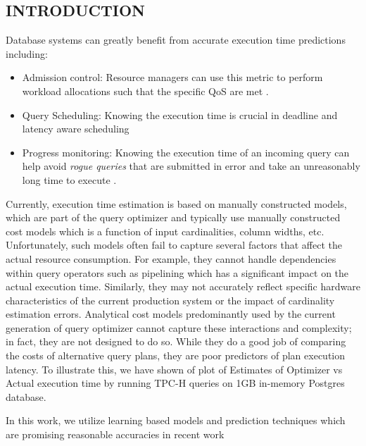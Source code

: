 \documentclass{article}
\begin{document}
	\begin{multicols}{2}
	\section{INTRODUCTION}
	Database systems can greatly benefit from accurate execution time predictions including: 
	\begin{itemize}
	\item Admission control: Resource managers can use this metric to perform workload allocations such that the specific QoS are met \cite{activeSLA}.
	\item Query Scheduling: Knowing the execution time is crucial in deadline and latency aware 			scheduling
	\item Progress monitoring: Knowing the execution time of an incoming query can help avoid \textit{rogue queries} that are submitted in error and take an unreasonably long time to execute \cite{progress}.
	\end{itemize}
	Currently, execution time estimation is based on manually constructed
	models, which are part of the query optimizer and typically use
	manually constructed cost models which is a function of input cardinalities, 
	column widths, etc. Unfortunately, such
	models often fail to capture several factors that affect the actual
	resource consumption. For example, they cannot handle dependencies within query operators 
	such as pipelining which has a significant impact on the actual execution time.
	Similarly, they may not accurately reflect
	specific hardware characteristics of the current production system
	or the impact of cardinality estimation errors. Analytical cost models predominantly 
	used by the current generation of query optimizer cannot
	capture these interactions and complexity; in fact, they are not designed to do so. 
	While they do a good job of comparing the costs of alternative query plans,
	they are poor predictors of plan execution latency. To illustrate this, we have shown of plot of 		
	Estimates of Optimizer vs Actual execution time by running TPC-H queries on 1GB in-memory Postgres 		
	database.
	
	In this work, we utilize learning based models and prediction techniques which are promising reasonable accuracies in recent work \cite{ganapathi,MSR,ICDE2012}
	

\end{multicols}
\end{document}
